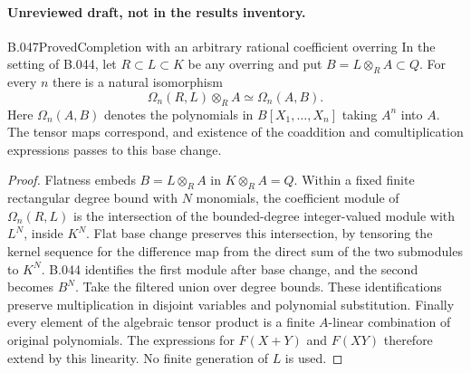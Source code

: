 \paragraph*{Unreviewed draft, not in the results inventory.}

\begin{saresult}{B.047}{Proved}{Completion with an arbitrary rational coefficient overring}
In the setting of B.044, let $R\subset L\subset K$ be
any overring and put $B=L\otimes_R A\subset Q$.
For every $n$ there is a natural isomorphism
\[
 \Omega_n(R,L)\otimes_R A\simeq\Omega_n(A,B).
\]
Here $\Omega_n(A,B)$ denotes the polynomials in $B[X_1,
\ldots,X_n]$ taking $A^n$ into $A$. The tensor maps
correspond, and existence of the coaddition and
comultiplication expressions passes to this base change.
\end{saresult}
\begin{proof}
Flatness embeds $B=L\otimes_R A$ in $K\otimes_R A=Q$.
Within a fixed finite rectangular degree bound with $N$
monomials, the coefficient module of $\Omega_n(R,L)$ is
the intersection of the bounded-degree integer-valued
module with $L^N$, inside $K^N$. Flat base change preserves
this intersection, by tensoring the kernel sequence for
the difference map from the direct sum of the two
submodules to $K^N$. B.044 identifies the first module
after base change, and the second becomes $B^N$.
Take the filtered union over degree bounds. These
identifications preserve multiplication in disjoint
variables and polynomial substitution. Finally every
element of the algebraic tensor product is a finite
$A$-linear combination of original polynomials. The
expressions for $F(X+Y)$ and $F(XY)$ therefore extend
by this linearity. No finite generation of $L$ is used.
\end{proof}

